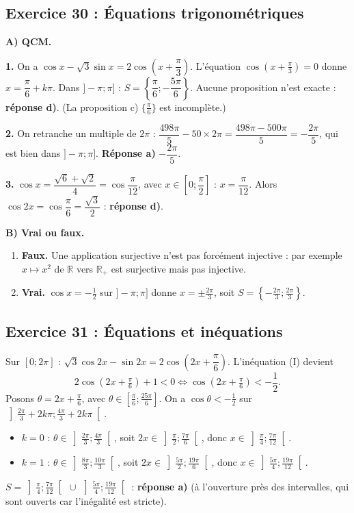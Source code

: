 \documentclass[11pt,a4paper]{article}
\newcommand{\R}{\mathbb{R}}
\begin{document}
\subsection{Exercice 30 : \'Equations trigonom\'etriques}

\textbf{A) QCM.}

\textbf{1.} On a $\cos x-\sqrt3\sin x=2\cos\left(x+\dfrac{\pi}{3}\right)$. L'\'equation $\cos\left(x+\frac{\pi}{3}\right)=0$ donne
$x=\dfrac{\pi}{6}+k\pi$. Dans $]-\pi;\pi]$ : $S=\left\{\dfrac{\pi}{6};-\dfrac{5\pi}{6}\right\}$.
Aucune proposition n'est exacte : \textbf{r\'eponse d)}. (La proposition c) $\{\frac{\pi}{6}\}$ est incompl\`ete.)

\textbf{2.} On retranche un multiple de $2\pi$ : $\dfrac{498\pi}{5}-50\times2\pi=\dfrac{498\pi-500\pi}{5}=-\dfrac{2\pi}{5}$, qui est bien dans $]-\pi;\pi]$.
\textbf{R\'eponse a)} $-\dfrac{2\pi}{5}$.

\textbf{3.} $\cos x=\dfrac{\sqrt6+\sqrt2}{4}=\cos\dfrac{\pi}{12}$, avec $x\in\left[0;\dfrac{\pi}{2}\right]$ : $x=\dfrac{\pi}{12}$.
Alors $\cos2x=\cos\dfrac{\pi}{6}=\dfrac{\sqrt3}{2}$ : \textbf{r\'eponse d)}.

\textbf{B) Vrai ou faux.}
\begin{enumerate}
  \item \textbf{Faux.} Une application surjective n'est pas forc\'ement injective : par exemple $x\mapsto x^2$ de $\R$ vers $\R_+$ est surjective mais pas injective.
  \item \textbf{Vrai.} $\cos x=-\frac12$ sur $]-\pi;\pi]$ donne $x=\pm\frac{2\pi}{3}$, soit $S=\left\{-\frac{2\pi}{3};\frac{2\pi}{3}\right\}$.
\end{enumerate}

\subsection{Exercice 31 : \'Equations et in\'equations}

Sur $[0;2\pi]$ : $\sqrt3\cos2x-\sin2x=2\cos\left(2x+\dfrac{\pi}{6}\right)$. L'in\'equation (I) devient
\[
2\cos\left(2x+\tfrac{\pi}{6}\right)+1<0\iff\cos\left(2x+\tfrac{\pi}{6}\right)<-\frac12.
\]
Posons $\theta=2x+\frac{\pi}{6}$, avec $\theta\in\left[\frac{\pi}{6};\frac{25\pi}{6}\right]$. On a $\cos\theta<-\frac12$ sur
$\left]\frac{2\pi}{3}+2k\pi;\frac{4\pi}{3}+2k\pi\right[$.
\begin{itemize}
  \item $k=0$ : $\theta\in\left]\frac{2\pi}{3};\frac{4\pi}{3}\right[$, soit $2x\in\left]\frac{\pi}{2};\frac{7\pi}{6}\right[$, donc $x\in\left]\frac{\pi}{4};\frac{7\pi}{12}\right[$.
  \item $k=1$ : $\theta\in\left]\frac{8\pi}{3};\frac{10\pi}{3}\right[$, soit $2x\in\left]\frac{5\pi}{2};\frac{19\pi}{6}\right[$, donc $x\in\left]\frac{5\pi}{4};\frac{19\pi}{12}\right[$.
\end{itemize}
\textbf{$S=\left]\frac{\pi}{4};\frac{7\pi}{12}\right[\ \cup\ \left]\frac{5\pi}{4};\frac{19\pi}{12}\right[$} : \textbf{r\'eponse a)}
(\`a l'ouverture pr\`es des intervalles, qui sont ouverts car l'in\'egalit\'e est stricte).
\end{document}
